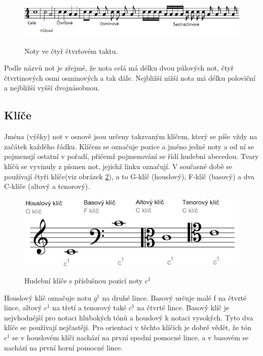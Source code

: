 \begin{figure}[h]\centering
    \centering
    \includegraphics[width=0.8\linewidth]{obrazky/druhyNot.png}\\[1pt]  
    \caption{Noty ve čtyř čtvrťovém taktu.}    
    \label{obrazekNoty}
\end{figure}

Podle názvů not je zřejmé, že nota celá má délku dvou půlových not, 
čtyř čtvrtinových osmi osminových a tak dále.
Nejbližší nižší nota má délku poloviční a nejbližší vyšší dvojnásobnou.
\par

\subsection{Klíče}
Jména (výšky) not v osnově jsou určeny takzvaným klíčem, 
který se píše vždy na začátek každého řádku.
Klíčem se označuje pozice a jméno jedné noty 
a od ní se pojmenují ostatní v pořadí, 
přičemž pojmenování se řídí hudební abecedou.
Tvary klíčů se vyvinuly z písmen not, jejichž linku označují.
V současné době se používají čtyři klíče(viz obrázek \ref{obrazek4Klice}), 
a to G-klíč (houslový), F-klíč (basový) a dva C-klíče (altový a tenorový).

\begin{figure}[h]\centering
    \centering
    \includegraphics[width=0.6\linewidth]{obrazky/Klíče.png}\\[1pt]  
    \caption{Hudební klíče s příslušnou pozicí noty $c^1$}    
    \label{obrazek4Klice}
\end{figure}

Houslový klíč označuje notu $g^1$ na druhé lince.
Basový určuje malé f na čtvrté lince, altový $c^1$ na třetí 
a tenorový také $c^1$ na čtvrté lince.
Basový klíč je nejvhodnější pro notaci hlubokých tónů 
a houslový k notaci vysokých.
Tyto dva klíče se používají nejčastěji. 
Pro orientaci v těchto klíčích je dobré vědět, že
tón $c^1$ se v houslovém klíči nachází na první spodní pomocné lince, 
a v basovém se nachází na první horní pomocné lince.
\cite{cmiral,zenkl}
\par

